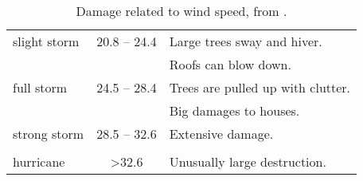 \begin{table}[t!]
	\begin{center}
		\caption{Damage related to wind speed, from \cite{faeraas_urd_2016}. }\label{tab:wind}
		\begin{tabular}{l|c|l}
			\hline \hline
			slight storm& \SI{20.8}{\mPs} -- \SI{24.4}{\mPs}&  Large trees sway and hiver. \\
			&  &  Roofs can blow down. \\ \hline
			full storm & \SI{24.5}{\mPs} -- \SI{28.4}{\mPs}& Trees are pulled up with clutter. \\
			&  & Big damages to houses.\\ \hline
			strong storm & \SI{28.5}{\mPs} -- \SI{32.6}{\mPs}& Extensive damage.\\
			&  & \\ \hline
			hurricane & \textgreater \SI{32.6}{\mPs}& Unusually large destruction.\\
			\hline \hline
		\end{tabular}
	\end{center}
\end{table}